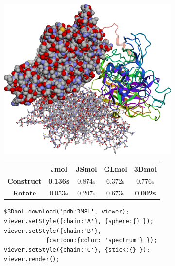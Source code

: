 \documentclass[]{bioinfo}
\begin{document}
\begin{figure}
\centering
\begin{minipage}[b]{.9\linewidth}
\begin{subfigure}[b]{\linewidth} \centering
\includegraphics[width=\linewidth]{screenshot}
\caption{}\label{pic}
\end{subfigure}
\end{minipage}

\begin{minipage}[b]{\linewidth}
\begin{subfigure}[b]{\linewidth} \centering
\begin{tabular}{ccccc}
 & \textbf{Jmol} & \textbf{JSmol} & \textbf{GLmol} &\textbf{3Dmol} \\
\textbf{Construct} & \textbf{0.136s} & 0.874s & 6.372s & 0.776s \\
\textbf{Rotate} & 0.053s & 0.207s & 0.673s & \textbf{0.002s} 
\end{tabular}
\caption{}\label{perf}
\end{subfigure}

\begin{subfigure}[b]{\linewidth} \centering
\begin{verbatim}
$3Dmol.download('pdb:3M8L', viewer);
viewer.setStyle({chain:'A'}, {sphere:{} });
viewer.setStyle({chain:'B'}, 
            {cartoon:{color: 'spectrum'} });
viewer.setStyle({chain:'C'}, {stick:{} });
viewer.render();
\end{verbatim}
\caption{}\label{code}
\end{subfigure}


\end{minipage}
\end{figure}
\end{document}
